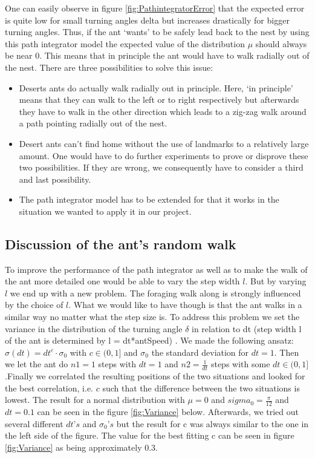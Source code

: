 \documentclass[11pt]{article}
\begin{document}
One can easily observe in figure \ref{fig:PathintegratorError}  that the expected error is quite low for small turning angles delta but increases drastically for bigger turning angles. Thus, if the ant ‘wants’ to be safely lead back to the nest by using this path integrator model the expected value of the distribution $\mu$ should always be near 0. This means that in principle the ant would have to walk radially out of the nest. There are three possibilities to solve this issue:
\begin{itemize}
\item Deserts ants do actually walk radially out in principle. Here, ‘in principle’ means that they can walk to the left or to right respectively but afterwards they have to walk in the other direction which leads to a zig-zag walk around a path pointing radially out of the nest. 
\item Desert ants can’t find home without the use of landmarks to a relatively large amount.
One would have to do further experiments to prove or disprove these two possibilities. If they are wrong, we consequently have to consider a third and last possibility.
\item The path integrator model has to be extended for that it works in the situation we wanted to apply it in our project.
\end{itemize}

\subsection{Discussion of the ant's random walk}
To improve the performance of the path integrator as well as to make the walk of the ant more detailed one would be able to vary the step width $l$. 
But by varying $l$ we end up with a new problem. The foraging walk along is strongly influenced by the choice of $l$. What we would like to have though is that the ant walks in a similar way no matter what the step size is. 
To address this problem we set the variance in the distribution of the turning angle $\delta$ in relation to dt (step width l of the ant is determined by l = dt*antSpeed) . 
We made the following ansatz: $\sigma(dt) = dt^{c} \cdot \sigma_{0}$ with $c \in (0,1]$ and $\sigma_{0}$ the standard deviation for $dt = 1$.
Then we let the ant do $n1=1$ steps with $dt=1$ and $n2=\frac{1}{dt}$ steps with some $dt \in (0,1]$.Finally we correlated the resulting positions of the two situations and looked for the best correlation, i.e. $c$ such that the difference between the two situations is lowest. 
The result for a normal distribution with $\mu = 0$ and $sigma_{0} = \frac{\pi}{12}$ and $dt = 0.1$ can be seen in the figure \ref{fig:Variance} below.
Afterwards, we tried out several different $dt’s$ and $\sigma_{0}’s$ but the result for c was always similar to the one in the left side of the figure. The value for the best fitting c can be seen in figure \ref{fig:Variance} as being approximately 0.3.  
\end{document}
